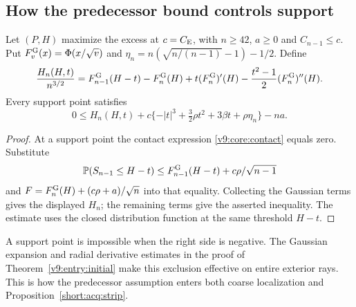 \subsection{How the predecessor bound controls support}
\begin{lemma}
\label{opus:predecessor-support}
Let $(P,H)$ maximize the excess at $c=C_{\mathrm E}$, with $n\ge42$,
$a\ge0$ and $C_{n-1}\le c$. Put
$F_v^{\rm G}(x)=\Phi(x/\sqrt v)$ and
$\eta_n=n(\sqrt{n/(n-1)}-1)-1/2$. Define
\[
 \frac{H_n(H,t)}{n^{3/2}}
 =F_{n-1}^{\rm G}(H-t)-F_n^{\rm G}(H)
 +t(F_n^{\rm G})'(H)-\frac{t^2-1}{2}(F_n^{\rm G})''(H).
\]
Every support point satisfies
\[
 0\le H_n(H,t)+c\{-|t|^3+\tfrac32\rho t^2+3\beta t+\rho\eta_n\}-na.
\]
\end{lemma}
\begin{proof}
At a support point the contact expression
\eqref{v9:core:contact} equals zero. Substitute
\[
 \mathbb P(S_{n-1}\le H-t)\le F_{n-1}^{\rm G}(H-t)
                           +c\rho/\sqrt{n-1}
\]
and $F=F_n^{\rm G}(H)+(c\rho+a)/\sqrt n$ into that equality.
Collecting the Gaussian terms gives the displayed $H_n$;
the remaining terms give the asserted inequality. The estimate uses
the closed distribution function at the same threshold $H-t$.
\end{proof}
A support point is impossible when the right side is negative.
The Gaussian expansion and radial derivative estimates in the proof of
Theorem~\ref{v9:entry:initial} make this exclusion effective on entire
exterior rays. This is how the predecessor assumption enters both
coarse localization and Proposition~\ref{short:acq:strip}.

